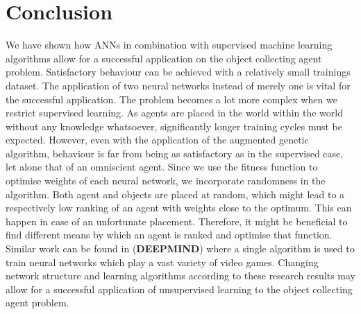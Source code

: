 \documentclass[10pt,a4paper,DIV=11]{scrreprt}
\begin{document}
\chapter{Conclusion}
\label{ch:conclusion}
We have shown how ANNs in combination with supervised machine learning algorithms allow for a successful application on the
object collecting agent problem. Satisfactory behaviour can be achieved with a relatively small trainings dataset. The application of two neural
networks instead of merely one is vital for the successful application. The problem becomes a lot more complex when we restrict supervised learning. As 
agents are placed in the world within the world without any knowledge whatsoever, significantly longer training cycles must be expected. However, 
even with the application of the augmented genetic algorithm, behaviour is far from being as satisfactory as in the supervised case, let alone that
of an omniscient agent. Since we use the fitness function to optimise weights of each neural network, we incorporate randomness in the algorithm. 
Both agent and objects are placed at random, which might lead to a respectively low ranking of an agent with weights close to the optimum. This can 
happen in case of an unfortunate placement. Therefore, it might be beneficial to find different means by which an agent is ranked and optimise that
function. Similar work can be found in \cite{DEEPMIND} (\textbf{DEEPMIND}) where a single algorithm is used to train neural networks which play a 
vast variety of video games. Changing network structure and learning algorithms according to these research results may allow for a successful 
application of unsupervised learning to the object collecting agent problem. 


\newpage


\listoffigures
\listoftables
\listofalgorithms
\lstlistoflistings




\end{document}
